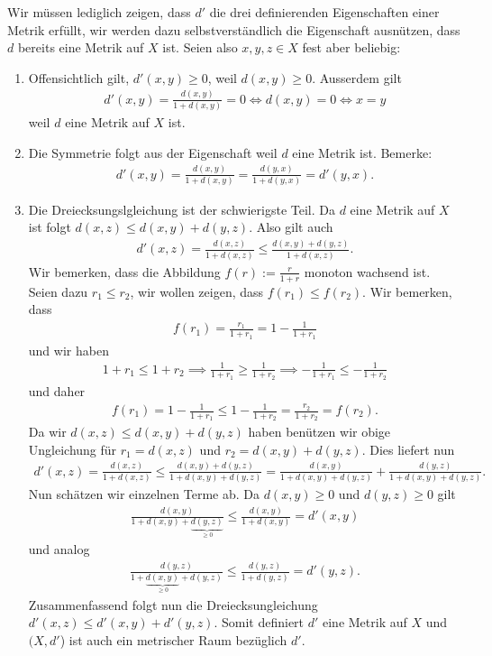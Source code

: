 \documentclass[a4paper, 20]{exam}
\begin{document}
\begin{solution} Wir müssen lediglich zeigen, dass $d'$ die drei definierenden Eigenschaften einer Metrik erfüllt, wir werden dazu selbstverständlich die Eigenschaft ausnützen, dass $d$ bereits eine Metrik auf $X$ ist. Seien also $x,y,z \in X$ fest aber beliebig:
\begin{enumerate}
\item Offensichtlich gilt, $d'(x,y) \geq 0$, weil $d(x,y) \geq 0$. Ausserdem gilt 
\begin{align*}
d'(x,y)= \frac{d(x,y)}{1+d(x,y)}=0 \iff d(x,y)=0 \iff x=y
\end{align*}
weil $d$ eine Metrik auf $X$ ist. 
\item Die Symmetrie folgt aus der Eigenschaft weil $d$ eine Metrik ist. Bemerke:
\begin{align*}
d'(x,y)= \frac{d(x,y)}{1+d(x,y)}= \frac{d(y,x)}{1+d(y,x)}=d'(y,x).
\end{align*}
\item Die Dreiecksungslgleichung ist der schwierigste Teil. Da $d$ eine Metrik auf $X$ ist folgt $d(x,z) \leq d(x,y)+d(y,z)$. Also gilt auch
\begin{align*}
d'(x,z) = \frac{d(x,z)}{1+d(x,z)} \leq \frac{d(x,y)+d(y,z)}{1+d(x,z)}.
\end{align*}
Wir bemerken, dass die Abbildung $f(r):= \frac{r}{1+r}$ monoton wachsend ist. Seien dazu $r_1 \leq r_2$, wir wollen zeigen, dass $f(r_1) \leq f(r_2)$. Wir bemerken, dass 
\begin{align*}
f(r_1) = \frac{r_1}{1+r_1}= 1- \frac{1}{1+r_1}
\end{align*}
und wir haben
\begin{align*}
1+r_1 \leq 1+r_2 \implies \frac{1}{1+r_1} \geq \frac{1}{1+r_2} \implies - \frac{1}{1+r_1} \leq -\frac{1}{1+r_2}
\end{align*}
und daher 
\begin{align*}
f(r_1) = 1- \frac{1}{1+r_1} \leq 1 - \frac{1}{1+r_2} = \frac{r_2}{1+r_2}=f(r_2).
\end{align*}
Da wir $d(x,z) \leq d(x,y)+d(y,z)$ haben benützen wir obige Ungleichung für $r_1= d(x,z)$ und $r_2=d(x,y)+d(y,z)$. Dies liefert nun 
\begin{align*}
d'(x,z)= \frac{d(x,z)}{1+d(x,z)} \leq \frac{d(x,y)+d(y,z)}{1+d(x,y)+d(y,z)} = \frac{d(x,y)}{1+d(x,y)+d(y,z)}+ \frac{d(y,z)}{1+d(x,y)+d(y,z)}.
\end{align*}
Nun schätzen wir einzelnen Terme ab. Da $d(x,y) \geq 0$ und $d(y,z) \geq 0$ gilt
\begin{align*}
\frac{d(x,y)}{1+d(x,y)+\underbrace{d(y,z)}_{\geq 0}} \leq \frac{d(x,y)}{1+d(x,y)}=d'(x,y)
\end{align*}
und analog
\begin{align*}
\frac{d(y,z)}{1+\underbrace{d(x,y)}_{ \geq 0}+d(y,z)} \leq \frac{d(y,z)}{1+d(y,z)}=d'(y,z).
\end{align*}
Zusammenfassend folgt nun die Dreiecksungleichung $d'(x,z) \leq d'(x,y) + d'(y,z)$. Somit definiert $d'$ eine Metrik auf $X$ und $(X,d'$) ist auch ein metrischer Raum bezüglich $d'$. 
\end{enumerate}
\end{solution}
\end{document}
